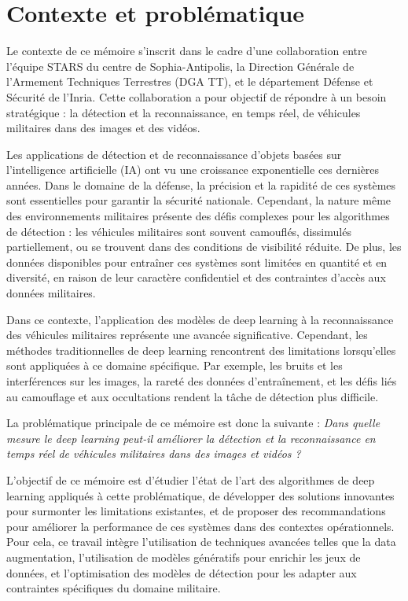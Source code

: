 \newpage
\section{Contexte et problématique}

Le contexte de ce mémoire s’inscrit dans le cadre d'une collaboration entre l'équipe STARS du centre de Sophia-Antipolis, la Direction Générale de l’Armement Techniques Terrestres (DGA TT), et le département Défense et Sécurité de l’Inria.
Cette collaboration a pour objectif de répondre à un besoin stratégique : la détection et la reconnaissance, en temps réel, de véhicules militaires dans des images et des vidéos.

Les applications de détection et de reconnaissance d’objets basées sur l’intelligence artificielle (IA) ont vu une croissance exponentielle ces dernières années.
Dans le domaine de la défense, la précision et la rapidité de ces systèmes sont essentielles pour garantir la sécurité nationale.
Cependant, la nature même des environnements militaires présente des défis complexes pour les algorithmes de détection : les véhicules militaires sont souvent camouflés, dissimulés partiellement, ou se trouvent dans des conditions de visibilité réduite.
De plus, les données disponibles pour entraîner ces systèmes sont limitées en quantité et en diversité, en raison de leur caractère confidentiel et des contraintes d’accès aux données militaires.

Dans ce contexte, l'application des modèles de deep learning à la reconnaissance des véhicules militaires représente une avancée significative.
Cependant, les méthodes traditionnelles de deep learning rencontrent des limitations lorsqu'elles sont appliquées à ce domaine spécifique.
Par exemple, les bruits et les interférences sur les images, la rareté des données d'entraînement, et les défis liés au camouflage et aux occultations rendent la tâche de détection plus difficile.

La problématique principale de ce mémoire est donc la suivante :
\textit{Dans quelle mesure le deep learning peut-il améliorer la détection et la reconnaissance en temps réel de véhicules militaires dans des images et vidéos ?}

L’objectif de ce mémoire est d'étudier l'état de l'art des algorithmes de deep learning appliqués à cette problématique, de développer des solutions innovantes pour surmonter les limitations existantes, et de proposer des recommandations pour améliorer la performance de ces systèmes dans des contextes opérationnels.
Pour cela, ce travail intègre l'utilisation de techniques avancées telles que la data augmentation, l'utilisation de modèles génératifs pour enrichir les jeux de données, et l'optimisation des modèles de détection pour les adapter aux contraintes spécifiques du domaine militaire.

